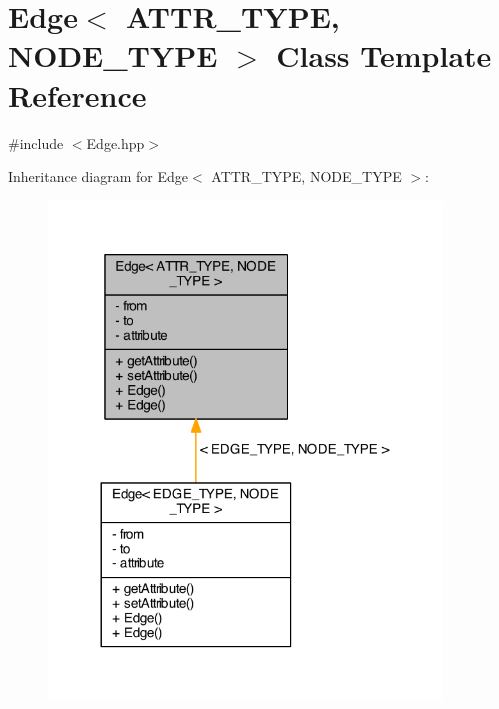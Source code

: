 \hypertarget{class_edge}{\section{Edge$<$ A\+T\+T\+R\+\_\+\+T\+Y\+P\+E, N\+O\+D\+E\+\_\+\+T\+Y\+P\+E $>$ Class Template Reference}
\label{class_edge}
}


{\ttfamily \#include $<$Edge.\+hpp$>$}



Inheritance diagram for Edge$<$ A\+T\+T\+R\+\_\+\+T\+Y\+P\+E, N\+O\+D\+E\+\_\+\+T\+Y\+P\+E $>$\+:\nopagebreak
\begin{figure}[H]
\begin{center}
\leavevmode
\includegraphics[width=296pt]{class_edge__inherit__graph}
\end{center}
\end{figure}


